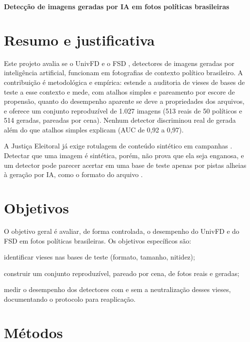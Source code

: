 \documentclass[11pt, a4paper, article, brazil]{abntex2}
\begin{document}
\begin{center}
  \textbf{Detecção de imagens geradas por IA em fotos políticas brasileiras}
\end{center}

\section{Resumo e justificativa}

Este projeto avalia se o UnivFD \cite{ojha2023} e o FSD \cite{nguyen2025}, detectores de imagens geradas por inteligência artificial, funcionam em fotografias de contexto político brasileiro. A contribuição é metodológica e empírica: estende a auditoria de vieses de bases de teste \cite{grommelt2024} a esse contexto e mede, com atalhos simples e pareamento por escore de propensão, quanto do desempenho aparente se deve a propriedades dos arquivos, e oferece um conjunto reproduzível de 1.027 imagens (513 reais de 50 políticos e 514 geradas, pareadas por cena). Nenhum detector discriminou real de gerada além do que atalhos simples explicam (AUC de 0,92 a 0,97).

A Justiça Eleitoral já exige rotulagem de conteúdo sintético em campanhas \cite{brasil2026}. Detectar que uma imagem é sintética, porém, não prova que ela seja enganosa, e um detector pode parecer acertar em uma base de teste apenas por pistas alheias à geração por IA, como o formato do arquivo \cite{grommelt2024}.

\section{Objetivos}

O objetivo geral é avaliar, de forma controlada, o desempenho do UnivFD e do FSD em fotos políticas brasileiras. Os objetivos específicos são:

\begin{alineas}
  \item identificar vieses nas bases de teste (formato, tamanho, nitidez);
  \item construir um conjunto reproduzível, pareado por cena, de fotos reais e geradas;
  \item medir o desempenho dos detectores com e sem a neutralização desses vieses, documentando o protocolo para reaplicação.
\end{alineas}

\section{Métodos}
\end{document}
